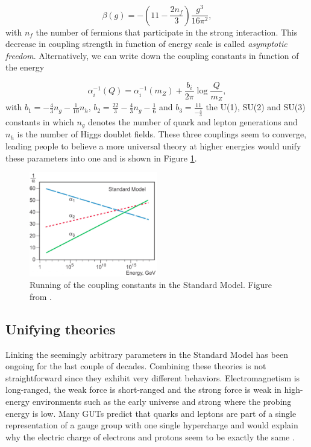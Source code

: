 \begin{equation}
\beta\left(g\right) = -\left(11 - \frac{2n_f}{3}\right)\frac{g^3}{16\pi^2},
\end{equation}
with $n_f$ the number of fermions that participate in the strong interaction. This decrease in coupling strength in function of energy scale is called \textit{asymptotic freedom}. Alternatively, we can write down the coupling constants in function of the energy 

\begin{equation}
\alpha^{-1}_i \left(Q\right) = \alpha^{-1}_{i}\left(m_Z\right) + \frac{b_i}{2\pi}\log\frac{Q}{m_Z},
\end{equation}
with $b_1 = -\frac{4}{3}n_g - \frac{1}{10}n_h$, $b_2 = \frac{22}{3}-\frac{4}{3}n_g-\frac{1}{6}$ and $b_3 = \frac{11}{-\frac{4}{3}}$ the U(1), SU(2) and
SU(3) constants in which $n_g$ denotes the  number of quark and lepton generations and $n_h$ is the number of Higgs doublet fields. These three couplings seem to converge, leading people to believe a more universal theory at higher energies would unify these parameters into one and is shown in Figure \ref{fig:running}.
\fi

\begin{figure}
\centering
\includegraphics[width = 0.5\textwidth]{chapter1/img/running}
\caption{Running of the coupling constants in the Standard Model. Figure from \cite{nobel2004url}.}
\label{fig:running}
\end{figure}

\subsection{Unifying theories}
\label{sub:unifying}
Linking the seemingly arbitrary parameters in the Standard Model has been ongoing for the last couple of decades. Combining these theories is not straightforward since they exhibit very different behaviors. Electromagnetism is long-ranged, the weak force is short-ranged and the strong force is weak in high-energy environments such as the early universe and strong where the probing energy is low. Many GUTs predict that quarks and leptons are part of a single representation of a gauge group with one single hypercharge and would explain why the electric charge of electrons and protons seem to be exactly the same \cite{He:1989eq}.

